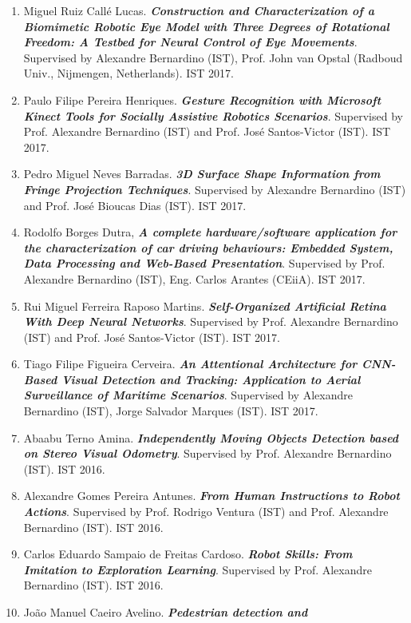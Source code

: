 \begin{enumerate}
\item
  Miguel Ruiz Callé Lucas. \emph{\textbf{Construction and
  Characterization of a Biomimetic Robotic Eye Model with Three Degrees
  of Rotational Freedom: A Testbed for Neural Control of Eye
  Movements}}. Supervised by Alexandre Bernardino (IST), Prof. John van
  Opstal (Radboud Univ., Nijmengen, Netherlands). IST 2017.
\item
  Paulo Filipe Pereira Henriques. \emph{\textbf{Gesture Recognition with
  Microsoft Kinect Tools for Socially Assistive Robotics Scenarios}}.
  Supervised by Prof. Alexandre Bernardino (IST) and Prof. José
  Santos-Victor (IST). IST 2017.
\item
  Pedro Miguel Neves Barradas. \emph{\textbf{3D Surface Shape
  Information from Fringe Projection Techniques}}. Supervised by
  Alexandre Bernardino (IST) and Prof. José Bioucas Dias (IST). IST
  2017.
\item
  Rodolfo Borges Dutra, \emph{\textbf{A complete hardware/software
  application for the characterization of car driving behaviours:
  Embedded System, Data Processing and Web-Based Presentation}}.
  Supervised by Prof. Alexandre Bernardino (IST), Eng. Carlos Arantes
  (CEiiA). IST 2017.
\item
  Rui Miguel Ferreira Raposo Martins. \emph{\textbf{Self-Organized
  Artificial Retina With Deep Neural Networks}}. Supervised by Prof.
  Alexandre Bernardino (IST) and Prof. José Santos-Victor (IST). IST
  2017.
\item
  Tiago Filipe Figueira Cerveira. \emph{\textbf{An Attentional
  Architecture for CNN-Based Visual Detection and Tracking: Application
  to Aerial Surveillance of Maritime Scenarios}}. Supervised by
  Alexandre Bernardino (IST), Jorge Salvador Marques (IST). IST 2017.
\item
  Abaabu Terno Amina. \emph{\textbf{Independently Moving Objects
  Detection based on Stereo Visual Odometry}}. Supervised by Prof.
  Alexandre Bernardino (IST). IST 2016.
\item
  Alexandre Gomes Pereira Antunes. \emph{\textbf{From Human Instructions
  to Robot Actions}}. Supervised by Prof. Rodrigo Ventura (IST) and
  Prof. Alexandre Bernardino (IST). IST 2016.
\item
  Carlos Eduardo Sampaio de Freitas Cardoso. \emph{\textbf{Robot Skills:
  From Imitation to Exploration Learning}}. Supervised by Prof.
  Alexandre Bernardino (IST). IST 2016.
\item
  João Manuel Caeiro Avelino. \emph{\textbf{Pedestrian detection and
}}
\end{enumerate}
